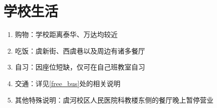 \section[学校生活]{学校生活}
\begin{enumerate}
    \item 购物：学校距离泰华、万达均较近
    \item 吃饭：虞新街、西虞巷以及周边有诸多餐厅
    \item 自习：因座位短缺，仅可在自己班教室自习
    \item 交通：详见\uline{\ref{free_bus}}处的相关说明
    \item 其他特殊说明：虞河校区人民医院科教楼东侧的餐厅晚上暂停营业
\end{enumerate}
